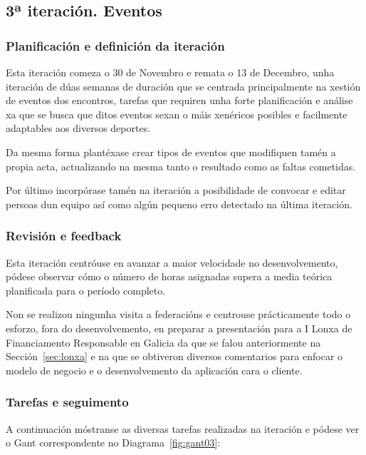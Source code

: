     \subsection{3ª iteración. Eventos}

      \subsubsection{Planificación e definición da iteración}
      Esta iteración comeza o 30 de Novembro e remata o 13 de Decembro, unha 
iteración de dúas semanas de duración que se centrada principalmente na xestión 
de eventos dos encontros, tarefas que requiren unha forte planificación e 
análise xa que se busca que ditos eventos sexan o máis xenéricos posibles e 
facilmente adaptables aos diversos deportes.

      Da mesma forma plantéxase crear tipos de eventos que modifiquen tamén a 
propia acta, actualizando na mesma tanto o resultado como as faltas cometidas.

      Por último incorpórase tamén na iteración a posibilidade de convocar e 
editar persoas dun equipo así como algún pequeno erro detectado na última 
iteración.

      \subsubsection{Revisión e feedback}
      Esta iteración centróuse en avanzar a maior velocidade no 
desenvolvemento, pódese observar cómo o número de horas asignadas supera a 
media teórica planificada para o período completo.

      Non se realizou ningunha visita a federacións e centrouse prácticamente 
todo o esforzo, fora do desenvolvemento, en preparar a presentación para a I 
Lonxa de Financiamento Responsable en Galicia da que se falou 
anteriormente na Sección~\ref{sec:lonxa} e na que se obtiveron diversos 
comentarios para enfocar o modelo de negocio e o desenvolvemento da aplicación 
cara o cliente.

      \subsubsection{Tarefas e seguimento}

      A continuación móstranse as diversas tarefas realizadas na iteración e 
pódese ver o Gant correspondente no Diagrama~\ref{fig:gant03}:

